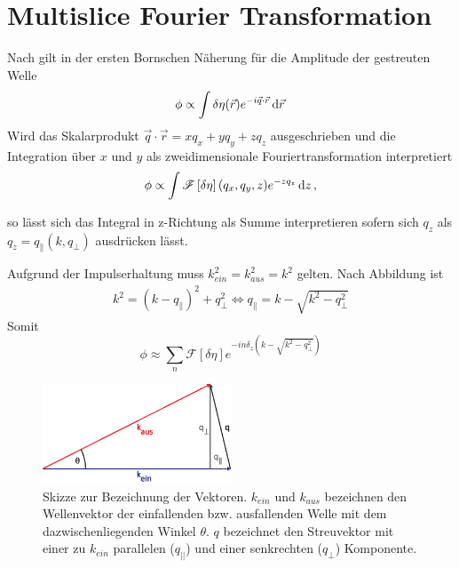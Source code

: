 \section{Multislice Fourier Transformation}
Nach  gilt in der ersten Bornschen Näherung für die Amplitude der gestreuten Welle
\begin{equation}
	\phi\propto\int \delta\eta(\vec{r}) e^{-i\vec{q}\cdot \vec{r}} \dif \vec{r}
\end{equation}
Wird das Skalarprodukt $\vec{q}\cdot \vec{r}=xq_x+yq_y+zq_z$ ausgeschrieben und die Integration über $x$ und $y$ als zweidimensionale Fouriertransformation interpretiert
\begin{equation}
	\phi\propto\int \mathscr{F}\left[\delta\eta\right](q_x,q_y,z) e^{-zq_z} \dif z \, ,
\end{equation}

so lässt sich das Integral in z-Richtung als Summe interpretieren sofern sich $q_z$ als $q_z=q_\parallel(k,q_\perp)$ ausdrücken lässt.
	
Aufgrund der Impulserhaltung muss $k_{ein}^2=k_{aus}^2=k^2$ gelten. Nach Abbildung  ist
\begin{align}
	k^2=(k-q_\parallel)^2+q_{\perp}^2                  
	\Leftrightarrow q_\parallel=k-\sqrt{k^2-q_\perp^2} 
\end{align}
Somit
\begin{equation}
	\label{eq:msft}
	\phi\approx\sum_n{\mathscr{F}\left[\delta\eta\right] e^{-in\delta_z\left(k-\sqrt{k^2-q_\perp^2}\right) }}
\end{equation}

\begin{figure}
	\centering
	\includegraphics[width=0.5\textwidth]{images/msft.eps}
	\caption[Vektoren bei MSFT]{Skizze zur Bezeichnung der Vektoren. $k_{ein}$ und $k_{aus}$ bezeichnen den Wellenvektor der einfallenden bzw. ausfallenden Welle mit dem dazwischenliegenden Winkel $\theta$. $q$ bezeichnet den Streuvektor mit einer zu $k_{ein}$ parallelen ($q_{||}$) und einer senkrechten ($q_\perp$) Komponente.}
	\label{fig:msft}
\end{figure} 

